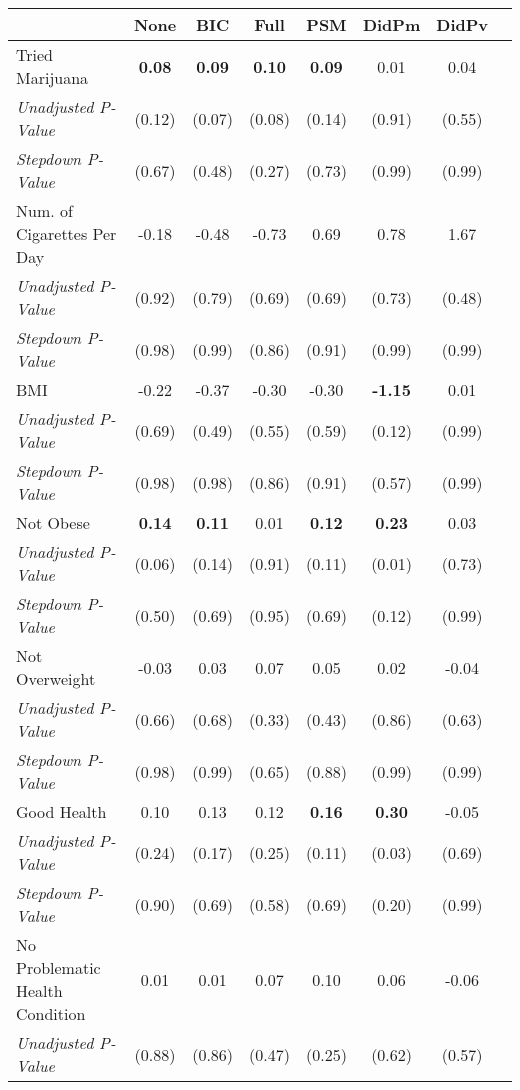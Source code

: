\begin{tabular}{l c c c c c c c}
\toprule
 & None & BIC & Full & PSM & DidPm & DidPv \\
\midrule
Tried Marijuana & \textbf{ 0.08 } & \textbf{ 0.09 } & \textbf{ 0.10 } & \textbf{ 0.09 } & 0.01 & 0.04 \\
\quad \textit{Unadjusted P-Value} & (0.12) & (0.07) & (0.08) & (0.14) & (0.91) & (0.55) \\
\quad \textit{Stepdown P-Value} & (0.67) & (0.48) & (0.27) & (0.73) & (0.99) & (0.99) \\
Num. of Cigarettes Per Day & -0.18 & -0.48 & -0.73 & 0.69 & 0.78 & 1.67 \\
\quad \textit{Unadjusted P-Value} & (0.92) & (0.79) & (0.69) & (0.69) & (0.73) & (0.48) \\
\quad \textit{Stepdown P-Value} & (0.98) & (0.99) & (0.86) & (0.91) & (0.99) & (0.99) \\
BMI & -0.22 & -0.37 & -0.30 & -0.30 & \textbf{ -1.15 } & 0.01 \\
\quad \textit{Unadjusted P-Value} & (0.69) & (0.49) & (0.55) & (0.59) & (0.12) & (0.99) \\
\quad \textit{Stepdown P-Value} & (0.98) & (0.98) & (0.86) & (0.91) & (0.57) & (0.99) \\
Not Obese & \textbf{ 0.14 } & \textbf{ 0.11 } & 0.01 & \textbf{ 0.12 } & \textbf{ 0.23 } & 0.03 \\
\quad \textit{Unadjusted P-Value} & (0.06) & (0.14) & (0.91) & (0.11) & (0.01) & (0.73) \\
\quad \textit{Stepdown P-Value} & (0.50) & (0.69) & (0.95) & (0.69) & (0.12) & (0.99) \\
Not Overweight & -0.03 & 0.03 & 0.07 & 0.05 & 0.02 & -0.04 \\
\quad \textit{Unadjusted P-Value} & (0.66) & (0.68) & (0.33) & (0.43) & (0.86) & (0.63) \\
\quad \textit{Stepdown P-Value} & (0.98) & (0.99) & (0.65) & (0.88) & (0.99) & (0.99) \\
Good Health & 0.10 & 0.13 & 0.12 & \textbf{ 0.16 } & \textbf{ 0.30 } & -0.05 \\
\quad \textit{Unadjusted P-Value} & (0.24) & (0.17) & (0.25) & (0.11) & (0.03) & (0.69) \\
\quad \textit{Stepdown P-Value} & (0.90) & (0.69) & (0.58) & (0.69) & (0.20) & (0.99) \\
No Problematic Health Condition & 0.01 & 0.01 & 0.07 & 0.10 & 0.06 & -0.06 \\
\quad \textit{Unadjusted P-Value} & (0.88) & (0.86) & (0.47) & (0.25) & (0.62) & (0.57) \\

\end{tabular}
